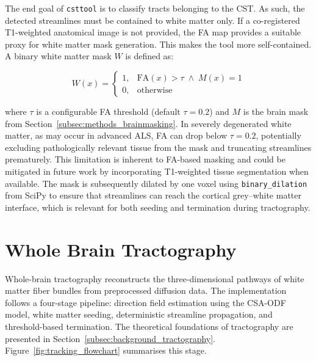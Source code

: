 The end goal of \texttt{csttool} is to classify tracts belonging to the CST. As such, the detected streamlines must be contained to white matter only. If a co-registered T1-weighted anatomical image is not provided, the FA map provides a suitable proxy for white matter mask generation. This makes the tool more self-contained. A binary white matter mask $W$ is defined as:

\begin{equation}
	W(x) =
	\begin{cases}
		1, & \mathrm{FA}(x) > \tau \;\wedge\; M(x) = 1 \\
		0, & \text{otherwise}
	\end{cases}
	\label{eq:wm_mask}
\end{equation}

where $\tau$ is a configurable FA threshold (default $\tau = 0.2$) and $M$ is the brain mask from Section~\ref{subsec:methods_brainmasking}. In severely degenerated white matter, as may occur in advanced ALS, FA can drop below $\tau = 0.2$, potentially excluding pathologically relevant tissue from the mask and truncating streamlines prematurely. This limitation is inherent to FA-based masking and could be mitigated in future work by incorporating T1-weighted tissue segmentation when available. The mask is subsequently dilated by one voxel using \texttt{binary\_dilation} from SciPy to ensure that streamlines can reach the cortical grey--white matter interface, which is relevant for both seeding and termination during tractography.

\section{Whole Brain Tractography}
\label{sec:methods_wholebraintractography}

Whole-brain tractography reconstructs the three-dimensional pathways of white matter fiber bundles from preprocessed diffusion data. The implementation follows a four-stage pipeline: direction field estimation using the CSA-ODF model, white matter seeding, deterministic streamline propagation, and threshold-based termination. The theoretical foundations of tractography are presented in Section~\ref{subsec:background_tractography}. Figure~\ref{fig:tracking_flowchart} summarises this stage.

